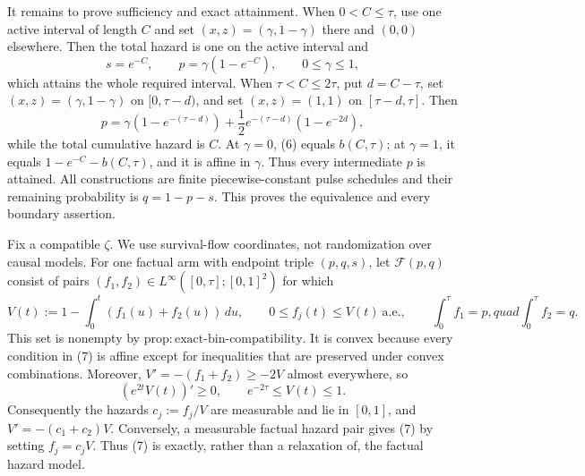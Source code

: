 It remains to prove sufficiency and exact attainment.  When \(0<C\le\tau\), use one active interval of length \(C\) and set \((x,z)=(\gamma,1-\gamma)\) there and \((0,0)\) elsewhere.  Then the total hazard is one on the active interval and
\[
 s=e^{-C},\quad\quad p=\gamma(1-e^{-C}),\quad\quad 0\le\gamma\le1,
\]
which attains the whole required interval.  When \(\tau<C\le2\tau\), put \(d=C-\tau\), set \((x,z)=(\gamma,1-\gamma)\) on \([0,\tau-d)\), and set \((x,z)=(1,1)\) on \([\tau-d,\tau]\).  Then
\[
 p=\gamma(1-e^{-(\tau-d)})
   +\frac12e^{-(\tau-d)}(1-e^{-2d}),                       \tag{6}
\]
while the total cumulative hazard is \(C\).  At \(\gamma=0\), (6) equals \(b(C,\tau)\); at \(\gamma=1\), it equals \(1-e^{-C}-b(C,\tau)\), and it is affine in \(\gamma\).  Thus every intermediate \(p\) is attained.  All constructions are finite piecewise-constant pulse schedules and their remaining probability is \(q=1-p-s\).  This proves the equivalence and every boundary assertion.

Fix a compatible \(\zeta\).  We use survival-flow coordinates, not randomization over causal models.  For one factual arm with endpoint triple \((p,q,s)\), let \(\mathcal F(p,q)\) consist of pairs \((f_1,f_2)\in L^\infty([0,\tau];[0,1]^2)\) for which
\[
 V(t):=1-\int_0^t(f_1(u)+f_2(u))\,du,\quad\quad
 0\le f_j(t)\le V(t)\ \text{a.e.},\quad\quad
 \int_0^\tau f_1=p,quad \int_0^\tau f_2=q.               \tag{7}
\]
This set is nonempty by \(\mathrm{prop{:}exact\text{-}bin\text{-}compatibility}\).  It is convex because every condition in (7) is affine except for inequalities that are preserved under convex combinations.  Moreover, \(V'=-(f_1+f_2)\ge-2V\) almost everywhere, so
\[
 (e^{2t}V(t))'\ge0,\quad\quad e^{-2\tau}\le V(t)\le1.          \tag{8}
\]
Consequently the hazards \(c_j:=f_j/V\) are measurable and lie in \([0,1]\), and \(V'=-(c_1+c_2)V\).  Conversely, a measurable factual hazard pair gives (7) by setting \(f_j=c_jV\).  Thus (7) is exactly, rather than a relaxation of, the factual hazard model.

